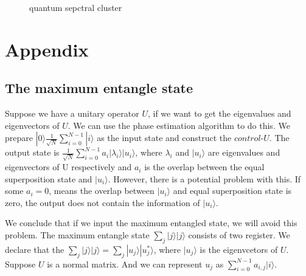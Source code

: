 \documentclass[onecolumn,notitlepage]{revtex4-1}
\def\ket#1{| #1 \rangle}
\begin{document}
\begin{figure}[H]
    \centering 
    \caption{quantum sepctral cluster}
    \label{Fig.main}
\end{figure}

\section{Appendix}

\subsection{The maximum entangle state}

Suppose we have a unitary operator $U$, if we want to get the eigenvalues and eigenvectors of $U$. We can use the phase estimation algorithm to do this. We prepare $\ket{0}\frac{1}{\sqrt{N}}\sum_{i=0}^{N-1}\ket{i}$ as the input state and construct the $control$-$U$. The output state is $\frac{1}{\sqrt{N}}\sum_{i=0}^{N-1}a_{i}\ket{\lambda_{i}}\ket{u_{i}}$, where $\lambda_{i}$ and $\ket{u_{i}}$ are eigenvalues and eigenvectors of U respectively and $a_{i}$ is the overlap between the equal superposition state and $\ket{u_{i}}$.
However, there is a potential problem with this. If some $a_{i}=0$, means the overlap between $\ket{u_{i}}$ and equal superposition state is zero, the output does not contain the information of $\ket{u_{i}}$.

We conclude that if we input the maximum entangled state, we will avoid this problem. The maximum entangle state $\sum_{j}\ket{j}\ket{j}$ consists of two register. We declare that the $\sum_{j}|j\rangle|j\rangle = \sum_{j}\ket{u_{j}}\ket{u_{j}^{*}}$, where $\ket{u_{j}}$ is the eigenvcetors of $U$. Suppose $U$ is a normal matrix. And we can represent $u_{j}$ as $\sum_{i=0}^{N-1}a_{i,j}\ket{i}$.
\end{document}

